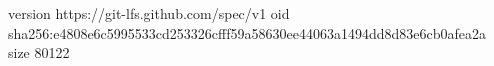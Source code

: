 version https://git-lfs.github.com/spec/v1
oid sha256:e4808e6c5995533cd253326cfff59a58630ee44063a1494dd8d83e6cb0afea2a
size 80122
